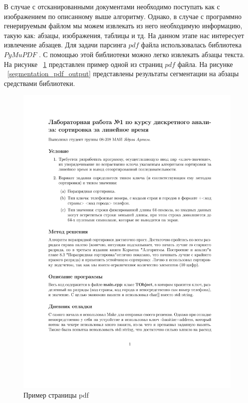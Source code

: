 В случае с отсканированными документами необходимо поступать как с изображением по описанному выше алгоритму. Однако, в случае с программно генерируемым файлом мы можем извлекать из него необходимую информацию, такую как: абзацы, изображения, таблицы и тд.
На данном этапе нас интересует извлечение абзацев. Для задачи парсинга $pdf$ файла использовалась библиотека $PyMuPDF$ \cite{PyMuPDF}. С помощью этой библиотеки можно легко извлекать абзацы текста. На рисунке ~\ref{segmentation_pdf_input} представлен пример одной из страниц $pdf$ файла. На рисунке ~\ref{segmentation_pdf_output} представлены результаты сегментации на абзацы средствами библиотеки.
\begin{figure}
    \includegraphics[scale=0.65]{img/paragraph/pdf_input.jpg}
    \caption{Пример страницы pdf}
    \label{segmentation_pdf_input}
\end{figure}

